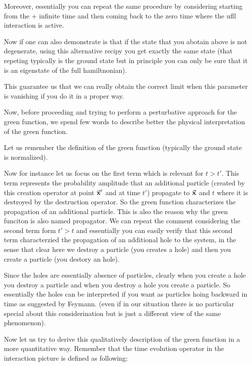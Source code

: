 \documentclass[../main/main.tex]{subfiles}
\begin{document}
Moreover, essentially you can repeat the same procedure by considering starting from the + infinite time and then coming back to the zero time where the ufll interaction is active.

Now if one can also demonstrate is that if the state that you abotain above is not degenerate, using this alternative recipy you get exactly the same state (that repeting typically is the ground state but in principle you can only be sure that it is an eigenstate of the full hamiltnonian).

This guarantee us that we can really obtain the correct limit when this parameter is vanishing if you do it in a proper way.







Now, before proceeding and trying to perform a perturbative approach for the green function, we spend few words to describe better the physical interpretation of the green function.

Let us remember the definition of the green function (typically the ground state is normalized).

Now for instance let us focus on the first term which is relevant for \( t>t' \). This term represents the probability amplitude that an additional particle (created by this creation operator at point \( \va{x}' \) and at time \( t' \)) propagate to \( \va{x} \) and \( t \) where it is destroyed by the destruction operator. So the green function characterizes the propagation of an additional particle. This is also the reason why the green funciton is also named propagator. We can repeat the comment considering the second term form \( t'>t \) and essentially you can easily verify that this second term characterzied the propagation of an additional hole to the system, in the sense that clear here we destroy a particle (you creates a hole) and then you create a particle (you destory an hole).

Since the holes are essentially absence of particles, clearly when you create a hole you destroy a particle and when you destroy a hole you create a particle. So essentially the holes can be interpreted if you want as particles hoing backward in time as suggested by Feymann. (even if in our situation there is no particular special about this considerination but is just a different view of the same phenomenon).


Now let us try to derive this qualitatively description of the green function in a more quantitative way. Remember that the time evolution operator in the interaction picture is defined as following:
\end{document}
